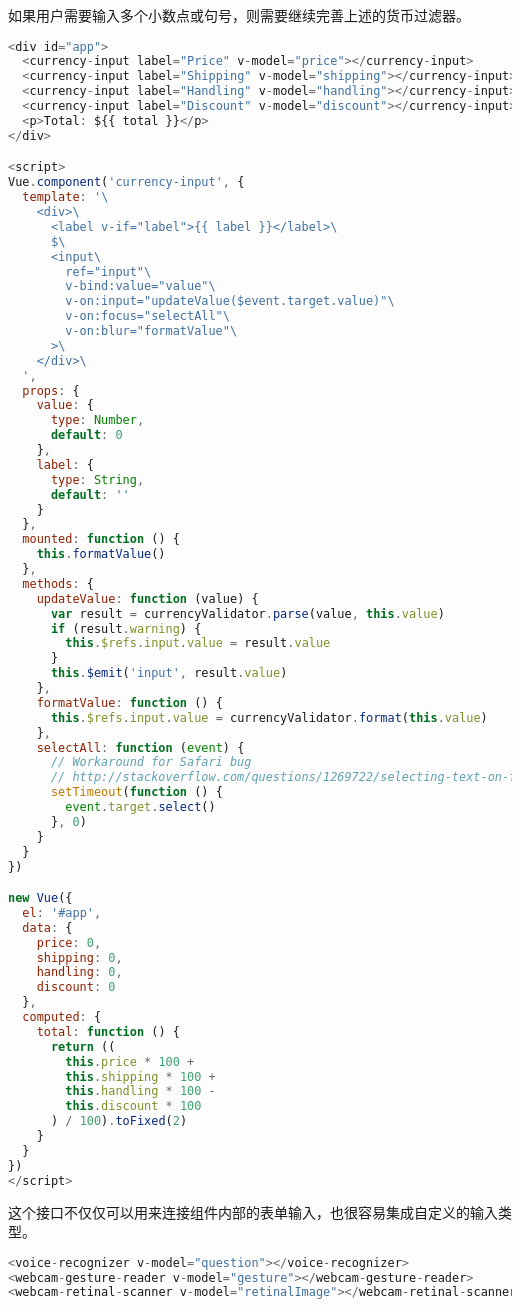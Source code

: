 如果用户需要输入多个小数点或句号，则需要继续完善上述的货币过滤器。


\begin{lstlisting}[language=JavaScript]
<div id="app">
  <currency-input label="Price" v-model="price"></currency-input>
  <currency-input label="Shipping" v-model="shipping"></currency-input>
  <currency-input label="Handling" v-model="handling"></currency-input>
  <currency-input label="Discount" v-model="discount"></currency-input>
  <p>Total: ${{ total }}</p>
</div>

<script>
Vue.component('currency-input', {
  template: '\
    <div>\
      <label v-if="label">{{ label }}</label>\
      $\
      <input\
        ref="input"\
        v-bind:value="value"\
        v-on:input="updateValue($event.target.value)"\
        v-on:focus="selectAll"\
        v-on:blur="formatValue"\
      >\
    </div>\
  ',
  props: {
    value: {
      type: Number,
      default: 0
    },
    label: {
      type: String,
      default: ''
    }
  },
  mounted: function () {
    this.formatValue()
  },
  methods: {
    updateValue: function (value) {
      var result = currencyValidator.parse(value, this.value)
      if (result.warning) {
        this.$refs.input.value = result.value
      }
      this.$emit('input', result.value)
    },
    formatValue: function () {
      this.$refs.input.value = currencyValidator.format(this.value)
    },
    selectAll: function (event) {
      // Workaround for Safari bug
      // http://stackoverflow.com/questions/1269722/selecting-text-on-focus-using-jquery-not-working-in-safari-and-chrome
      setTimeout(function () {
      	event.target.select()
      }, 0)
    }
  }
})

new Vue({
  el: '#app',
  data: {
    price: 0,
    shipping: 0,
    handling: 0,
    discount: 0
  },
  computed: {
    total: function () {
      return ((
        this.price * 100 + 
        this.shipping * 100 + 
        this.handling * 100 - 
        this.discount * 100
      ) / 100).toFixed(2)
    }
  }
})
</script>
\end{lstlisting}


这个接口不仅仅可以用来连接组件内部的表单输入，也很容易集成自定义的输入类型。


\begin{lstlisting}[language=JavaScript]
<voice-recognizer v-model="question"></voice-recognizer>
<webcam-gesture-reader v-model="gesture"></webcam-gesture-reader>
<webcam-retinal-scanner v-model="retinalImage"></webcam-retinal-scanner>
\end{lstlisting}




